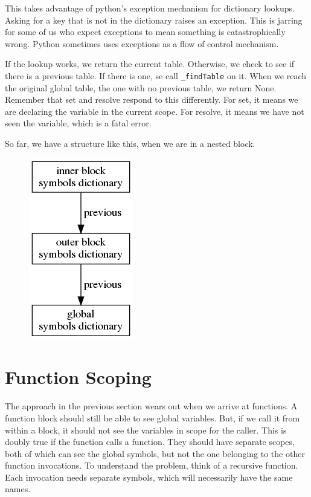 This takes advantage of python's exception mechanism for dictionary lookups.
Asking for a key that is not in the dictionary raises an exception.
This is jarring for some of us who expect exceptions to mean something
is catastrophically wrong. Python sometimes uses exceptions as a flow
of control mechanism.

If the lookup works, we return the current table. Otherwise, we
check to see if there is a previous table. If there is one, se
call \verb+_findTable+ on it. When we reach the original global table, the
one with no previous table, we return None. Remember that set and
resolve respond to this differently. For set, it means we are declaring
the variable in the current scope. For resolve, it means we have
not seen the variable, which is a fatal error.

So far, we have a structure like this, when we are in a nested block.

\begin{figure}
\centering
\includegraphics{blockscopesymboltable.png}
\end{figure}

\section{Function Scoping}

The approach in the previous section wears out when we arrive at
functions. A function block should still be able to see global variables.
But, if we call it from within a block, it should not
see the variables in scope for the caller. This is doubly true if the
function calls a function. They should have separate scopes, both
of which can see the global symbols, but not the one belonging to
the other function invocations. To understand the problem, think of
a recursive function. Each invocation needs separate symbols, which
will necessarily have the same names.


